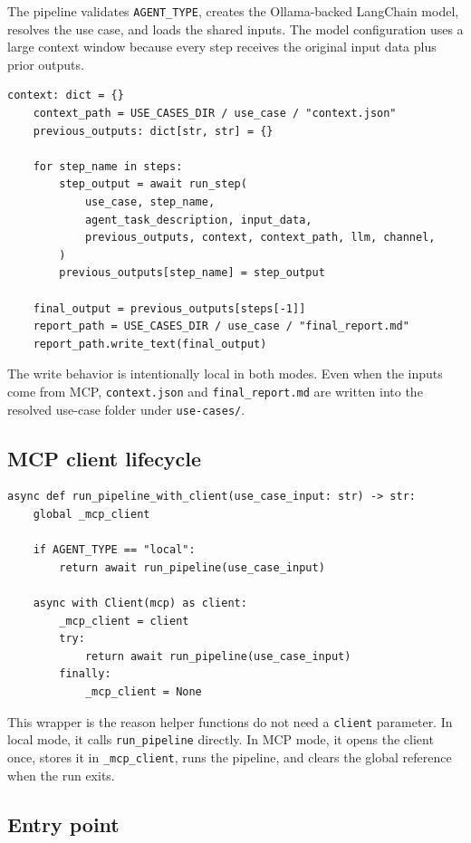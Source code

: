 \documentclass[12pt, a4paper]{article}
\begin{document}
The pipeline validates \texttt{AGENT\_TYPE}, creates the Ollama-backed LangChain model, resolves the use case, and loads the shared inputs. The model configuration uses a large context window because every step receives the original input data plus prior outputs.

\begin{lstlisting}[style=pythonstyle]
    context: dict = {}
    context_path = USE_CASES_DIR / use_case / "context.json"
    previous_outputs: dict[str, str] = {}

    for step_name in steps:
        step_output = await run_step(
            use_case, step_name,
            agent_task_description, input_data,
            previous_outputs, context, context_path, llm, channel,
        )
        previous_outputs[step_name] = step_output

    final_output = previous_outputs[steps[-1]]
    report_path = USE_CASES_DIR / use_case / "final_report.md"
    report_path.write_text(final_output)
\end{lstlisting}

The write behavior is intentionally local in both modes. Even when the inputs come from MCP, \texttt{context.json} and \texttt{final\_report.md} are written into the resolved use-case folder under \texttt{use-cases/}.

\subsection{MCP client lifecycle}

\begin{lstlisting}[style=pythonstyle]
async def run_pipeline_with_client(use_case_input: str) -> str:
    global _mcp_client

    if AGENT_TYPE == "local":
        return await run_pipeline(use_case_input)

    async with Client(mcp) as client:
        _mcp_client = client
        try:
            return await run_pipeline(use_case_input)
        finally:
            _mcp_client = None
\end{lstlisting}

This wrapper is the reason helper functions do not need a \texttt{client} parameter. In local mode, it calls \texttt{run\_pipeline} directly. In MCP mode, it opens the client once, stores it in \texttt{\_mcp\_client}, runs the pipeline, and clears the global reference when the run exits.

\subsection{Entry point}
\end{document}
